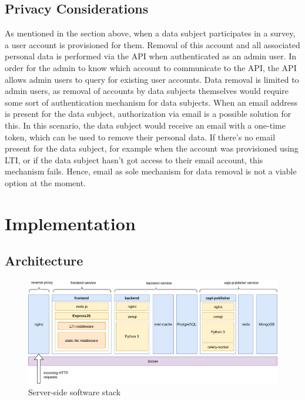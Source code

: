 \documentclass[a4paper,11pt]{article}
\begin{document}
            \subsection{Privacy Considerations}
                As mentioned in the section above, when a data subject participates
                in a survey, a user account is provisioned for them. Removal
                of this account and all associated personal data is performed
                via the API when authenticated as an admin user.
                In order for the admin to know which account to communicate
                to the API, the API allows admin users to query for existing
                user accounts. Data removal is limited to admin users,
                as removal of accounts by data subjects themselves would require
                some sort of authentication mechanism for data subjects.
                When an email address is present for the data subject,
                authorization via email is a possible solution for this.
                In this scenario, the data subject would receive an email
                with a one-time token, which can be used to remove their personal
                data. If there's no email present for the data subject, for example
                when the account was provisioned using LTI, or if the data subject
                hasn't got access to their email account, this mechanism fails.
                Hence, email as sole mechanism for data removal is not a viable
                option at the moment.
                
        \section{Implementation}
        \subsection{Architecture}
            \begin{figure}[H]
                \centering
                \includegraphics[width=\textwidth]{stack}
                \caption{Server-side software stack}
                \label{fig:stack}
            \end{figure}
\end{document}
